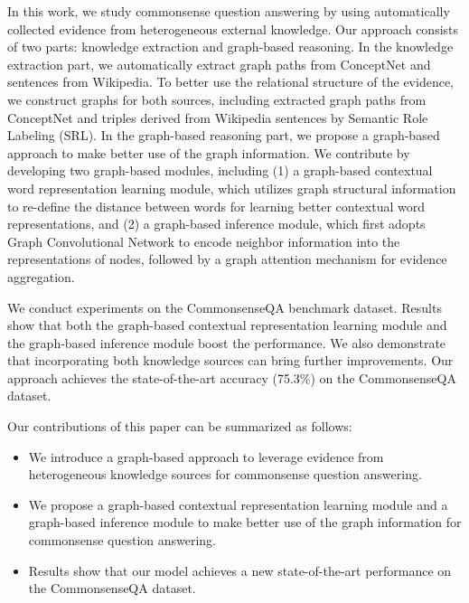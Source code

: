 \documentclass[letterpaper]{article} \usepackage{aaai20}  \usepackage{times}  \usepackage{helvet} \usepackage{courier}  \usepackage[hyphens]{url}  \usepackage{graphicx} \urlstyle{rm} \def\UrlFont{\rm}  \usepackage{graphicx}  \frenchspacing  \setlength{\pdfpagewidth}{8.5in}  \setlength{\pdfpageheight}{11in}
\begin{document}
In this work, we study commonsense question answering by 
using automatically 
collected evidence from heterogeneous external knowledge.
Our approach consists of two parts: knowledge extraction and graph-based reasoning. In the knowledge extraction part, we automatically extract graph paths from ConceptNet and sentences from Wikipedia. 
To better use the relational structure of the evidence, we construct graphs for both sources, including extracted graph paths from ConceptNet and 
triples derived from Wikipedia sentences by Semantic Role Labeling (SRL).
In the graph-based reasoning part, we propose a graph-based approach to make better use of the graph information.
We contribute by developing two graph-based modules, including (1) a graph-based contextual word representation learning module, which  utilizes graph structural information to re-define the distance between words for learning better contextual word representations, and (2) a graph-based inference module, which first
adopts Graph Convolutional Network \cite{kipf2016semi} to encode neighbor information into the representations of nodes, followed by a graph attention mechanism for evidence aggregation.

We conduct experiments on the CommonsenseQA benchmark dataset. 
Results show that both the graph-based contextual representation learning module and the graph-based inference module boost the performance.
We also demonstrate that incorporating both knowledge sources can bring further improvements.
Our approach
achieves the state-of-the-art accuracy (75.3\%) on the CommonsenseQA dataset.

Our contributions of this paper can be summarized as follows:
\begin{itemize}
    \item  We introduce a graph-based approach to leverage evidence from heterogeneous knowledge sources 
    for commonsense question answering.
    \item We propose a graph-based contextual representation learning module and a graph-based inference module to make better use of the graph information for commonsense question answering.
    \item Results show that our model achieves a new state-of-the-art performance on the CommonsenseQA dataset.
\end{itemize}
\end{document}
